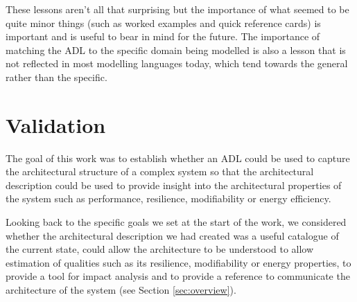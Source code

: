   These lessons aren't all that surprising but the importance of what seemed to be quite minor things (such as worked examples and quick reference cards) is important and is useful to bear in mind for the future.  The importance of matching the ADL to the specific domain being modelled is also a lesson that is not reflected in most modelling languages today, which tend towards the general rather than the specific.  

  \section{Validation} 
  \label{section:adlvalidation} 

  The goal of this work was to establish whether an ADL could be used to capture the architectural structure of a complex system so that the architectural description could be used to provide insight into the architectural properties of the system such as performance, resilience, modifiability or energy efficiency.

  Looking back to the specific goals we set at the start of the work, we considered whether the architectural description we had created was a useful catalogue of the current state, could allow the architecture to be understood to allow estimation of qualities such as its resilience, modifiability or energy properties, to provide a tool for impact analysis and to provide a reference to communicate the architecture of the system (see Section \ref{sec:overview}).
  
